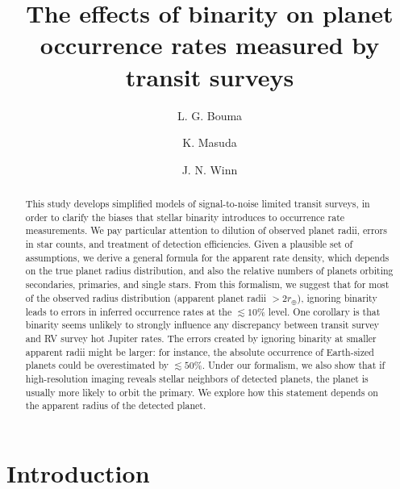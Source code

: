\documentclass[12pt,modern]{aastex61}
\begin{document}
    
\title{ The effects of binarity on planet occurrence rates measured by transit 
surveys}
%
%
\author{L. G. Bouma}
\author{K. Masuda}
\author{J. N. Winn}
%
%
\begin{abstract}
%
This study develops simplified models of signal-to-noise limited transit 
surveys, in order to clarify the biases that stellar binarity introduces
to occurrence rate measurements.
We pay particular attention to dilution of observed planet radii, errors in 
star counts, and treatment of detection efficiencies.
Given a plausible set of assumptions, we derive a general formula 
for the apparent rate density, which depends on the true 
planet radius distribution, and also the relative numbers of planets 
orbiting secondaries, primaries, and single stars.
From this formalism, we suggest that for most of the observed radius 
distribution (apparent planet radii $>2r_\oplus$), ignoring binarity 
leads to errors in inferred occurrence rates at the $\lesssim 10\%$ level.
One corollary is that binarity seems unlikely to strongly influence any 
discrepancy between transit survey and RV survey hot Jupiter rates.
The errors created by ignoring binarity at smaller apparent radii might be 
larger: for instance, the absolute occurrence of Earth-sized planets could be 
overestimated by $\lesssim 50\%$.
Under our formalism, we also show that if high-resolution imaging reveals 
stellar neighbors of detected planets, the planet is usually more likely to 
orbit the primary. We explore how this statement depends on the
apparent radius of the detected planet.
%
\end{abstract}
%
%
%

%

\section{Introduction}
\end{document}
